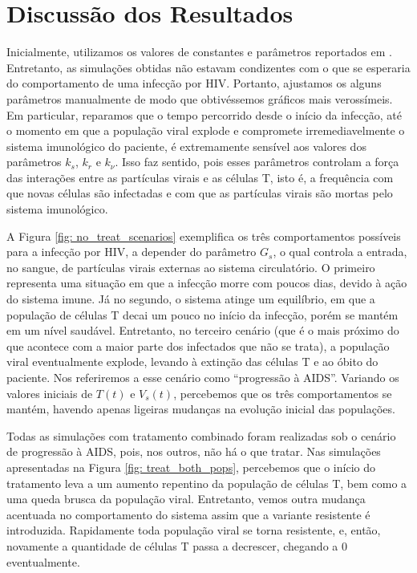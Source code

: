 \section{Discussão dos Resultados}

Inicialmente, utilizamos os valores de constantes e parâmetros reportados em \cite{model-combined}.
Entretanto, as simulações obtidas não estavam condizentes com o que se esperaria do comportamento de uma infecção por HIV.
Portanto, ajustamos os alguns parâmetros manualmente de modo que obtivéssemos gráficos mais verossímeis.
Em particular, reparamos que o tempo percorrido desde o início da infecção, até o momento em que a população viral explode e compromete irremediavelmente o sistema imunológico do paciente, é extremamente sensível aos valores dos parâmetros \( k_{ s } \), \( k_{ r } \) e \( k_{ \nu } \).
Isso faz sentido, pois esses parâmetros controlam a força das interações entre as partículas virais e as células T, isto é, a frequência com que novas células são infectadas e com que as partículas virais são mortas pelo sistema imunológico.

A Figura \ref{fig: no_treat_scenarios} exemplifica os três comportamentos possíveis para a infecção por HIV, a depender do parâmetro \( G_{ s } \), o qual controla a entrada, no sangue, de partículas virais externas ao sistema circulatório.
O primeiro representa uma situação em que a infecção morre com poucos dias, devido à ação do sistema imune.
Já no segundo, o sistema atinge um equilíbrio, em que a população de células T decai um pouco no início da infecção, porém se mantém em um nível saudável.
Entretanto, no terceiro cenário (que é o mais próximo do que acontece com a maior parte dos infectados que não se trata), a população viral eventualmente explode, levando à extinção das células T e ao óbito do paciente.
Nos referiremos a esse cenário como ``progressão à AIDS''.
Variando os valores iniciais de \( T ( t ) \) e \( V_{ s } ( t ) \), percebemos que os três comportamentos se mantém, havendo apenas ligeiras mudanças na evolução inicial das populações.

Todas as simulações com tratamento combinado foram realizadas sob o cenário de progressão à AIDS, pois, nos outros, não há o que tratar.
Nas simulações apresentadas na Figura \ref{fig: treat_both_pops}, percebemos que o início do tratamento leva a um aumento repentino da população de células T, bem como a uma queda brusca da população viral.
Entretanto, vemos outra mudança acentuada no comportamento do sistema assim que a variante resistente é introduzida.
Rapidamente toda população viral se torna resistente, e, então, novamente a quantidade de células T passa a decrescer, chegando a \( 0 \) eventualmente.

